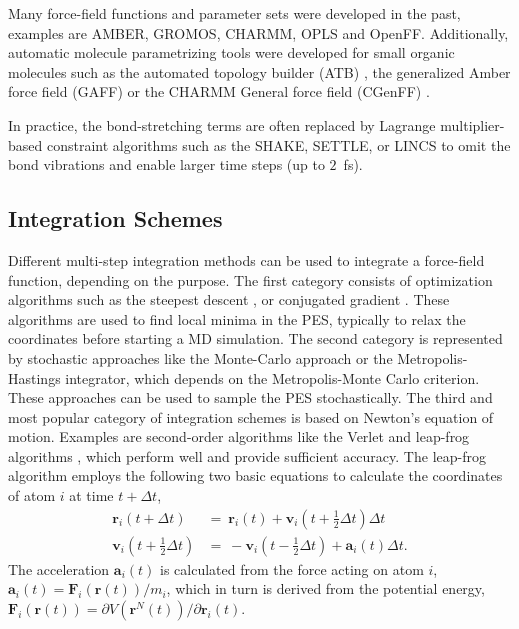 Many force-field functions and parameter sets were developed in the past, examples are AMBER\cite{Weiner1981, Pearlman1995, Cornell1995, Lindorfflarsen2010}, GROMOS\cite{Daura1998, Oostenbrink2004, Schuler2001, Schmid2011,Malde2011, Stroet2018}, CHARMM\cite{Brooks1983, Mackerell1995, Mackerell1998}, OPLS \cite{Jorgensen1988, Jorgensen1996} and OpenFF.\cite{Qiu2021}
Additionally, automatic molecule parametrizing tools were developed for small organic molecules such as the automated topology builder (ATB) \cite{Malde2011, Stroet2018}, the generalized Amber force field (GAFF)\cite{Sprenger2015} or the CHARMM General force field (CGenFF) \cite{Vanommeslaeghe2010}.

In practice, the bond-stretching terms are often replaced by Lagrange multiplier-based constraint algorithms such as the SHAKE\cite{Ryckaert1977, Ciccotti1986}, SETTLE,\cite{Miyamoto1992} or LINCS\cite{Hess1997} to omit the bond vibrations and enable larger time steps (up to $2$~fs). \cite{Ryckaert1977}


\subsection{Integration Schemes}
Different multi-step integration methods can be used to integrate a force-field function, depending on the purpose. 
%
The first category consists of optimization algorithms such as the steepest descent \cite{Debye1909}, or conjugated gradient \cite{Hestenes1952}. These algorithms are used to find local minima in the PES, typically to relax the coordinates before starting a MD simulation.\cite{Cazals2015}
The second category is represented by stochastic approaches like the Monte-Carlo approach or the Metropolis-Hastings integrator\cite{Hastings1970}, which depends on the Metropolis-Monte Carlo criterion\cite{Metropolis1953}. These approaches can be used to sample the PES stochastically. 
The third and most popular category of integration schemes is based on Newton's equation of motion\cite{Newton1726, Cohen1999}. 
Examples are second-order algorithms like the Verlet and leap-frog algorithms \cite{Hockney1970}, which perform well and provide sufficient accuracy.\cite{Gunsteren1990, Leimkuhler1996}
The leap-frog algorithm employs the following two basic equations to calculate the coordinates of atom $i$ at time $t+ \Delta t$,
\begin{equation}
    \begin{split}
        \textbf{r}_i(t+\Delta t)&=~\textbf{r}_i(t)+\textbf{v}_i(t+\frac{1}{2} \Delta t) \Delta t \\
        \textbf{v}_i(t+\frac{1}{2} \Delta t)&=~-\textbf{v}_i(t - \frac{1}{2} \Delta t)+\textbf{a}_i(t) \Delta t.
    \end{split}
\end{equation}
The acceleration $\textbf{a}_i(t)$ is calculated from the force acting on atom $i$, $\textbf{a}_i(t) = \textbf{F}_i(\textbf{r}(t))/m_i$, which in turn is derived from the potential energy, $\textbf{F}_i(\textbf{r}(t)) = \partial V(\textbf{r}^N(t))/ \partial \textbf{r}_i(t)$.\cite{Gunsteren1990}

